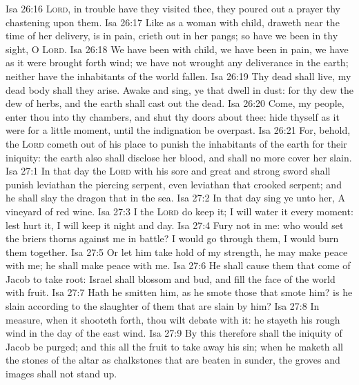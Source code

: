 \vs Isa 26:16 \textsc{Lord}, in trouble have they visited thee, they poured out a prayer  thy chastening  upon them.
\vs Isa 26:17 Like as a woman with child,  draweth near the time of her delivery, is in pain,  crieth out in her pangs; so have we been in thy sight, O \textsc{Lord}.
\vs Isa 26:18 We have been with child, we have been in pain, we have as it were brought forth wind; we have not wrought any deliverance in the earth; neither have the inhabitants of the world fallen.
\vs Isa 26:19 Thy dead  shall live,  my dead body shall they arise. Awake and sing, ye that dwell in dust: for thy dew  the dew of herbs, and the earth shall cast out the dead.
\vs Isa 26:20 Come, my people, enter thou into thy chambers, and shut thy doors about thee: hide thyself as it were for a little moment, until the indignation be overpast.
\vs Isa 26:21 For, behold, the \textsc{Lord} cometh out of his place to punish the inhabitants of the earth for their iniquity: the earth also shall disclose her blood, and shall no more cover her slain.
\vs Isa 27:1 In that day the \textsc{Lord} with his sore and great and strong sword shall punish leviathan the piercing serpent, even leviathan that crooked serpent; and he shall slay the dragon that  in the sea.
\vs Isa 27:2 In that day sing ye unto her, A vineyard of red wine.
\vs Isa 27:3 I the \textsc{Lord} do keep it; I will water it every moment: lest  hurt it, I will keep it night and day.
\vs Isa 27:4 Fury  not in me: who would set the briers  thorns against me in battle? I would go through them, I would burn them together.
\vs Isa 27:5 Or let him take hold of my strength,  he may make peace with me;  he shall make peace with me.
\vs Isa 27:6 He shall cause them that come of Jacob to take root: Israel shall blossom and bud, and fill the face of the world with fruit.
\vs Isa 27:7 Hath he smitten him, as he smote those that smote him?  is he slain according to the slaughter of them that are slain by him?
\vs Isa 27:8 In measure, when it shooteth forth, thou wilt debate with it: he stayeth his rough wind in the day of the east wind.
\vs Isa 27:9 By this therefore shall the iniquity of Jacob be purged; and this  all the fruit to take away his sin; when he maketh all the stones of the altar as chalkstones that are beaten in sunder, the groves and images shall not stand up.
